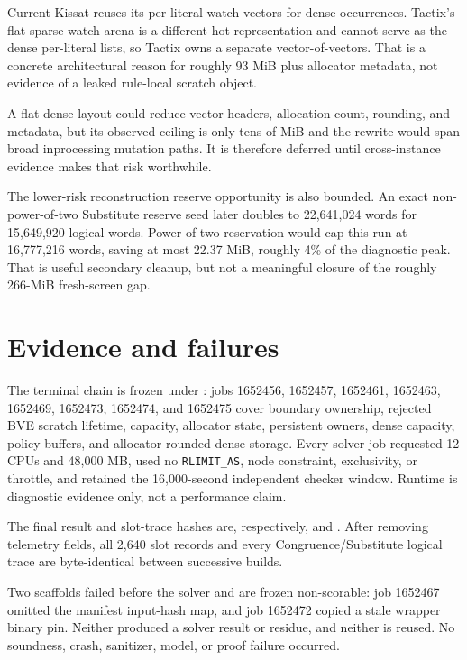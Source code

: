 \documentclass[11pt]{article}
\newcommand{\code}[1]{\texttt{#1}}
\begin{document}
Current Kissat reuses its per-literal watch vectors for dense occurrences.
Tactix's flat sparse-watch arena is a different hot representation and cannot
serve as the dense per-literal lists, so Tactix owns a separate vector-of-vectors.
That is a concrete architectural reason for roughly 93 MiB plus allocator
metadata, not evidence of a leaked rule-local scratch object.

A flat dense layout could reduce vector headers, allocation count, rounding,
and metadata, but its observed ceiling is only tens of MiB and the rewrite
would span broad inprocessing mutation paths.  It is therefore deferred until
cross-instance evidence makes that risk worthwhile.

The lower-risk reconstruction reserve opportunity is also bounded.  An exact
non-power-of-two Substitute reserve seed later doubles to 22,641,024 words for
15,649,920 logical words.  Power-of-two reservation would cap this run at
16,777,216 words, saving at most 22.37 MiB, roughly 4\% of the diagnostic peak.
That is useful secondary cleanup, but not a meaningful closure of the roughly
266-MiB fresh-screen gap.

\section{Evidence and failures}

The terminal chain is frozen under : jobs 1652456,
1652457, 1652461, 1652463, 1652469, 1652473, 1652474, and 1652475 cover
boundary ownership, rejected BVE scratch lifetime, capacity, allocator state,
persistent owners, dense capacity, policy buffers, and allocator-rounded dense
storage.  Every solver job requested 12 CPUs and 48,000 MB, used no
\code{RLIMIT\_AS}, node constraint, exclusivity, or throttle, and retained the
16,000-second independent checker window.  Runtime is diagnostic evidence
only, not a performance claim.

The final result and slot-trace hashes are, respectively,
 and
.  After removing telemetry fields, all 2,640
slot records and every Congruence/Substitute logical trace are byte-identical
between successive builds.

Two scaffolds failed before the solver and are frozen non-scorable: job 1652467
omitted the manifest input-hash map, and job 1652472 copied a stale wrapper
binary pin.  Neither produced a solver result or residue, and neither is reused.
No soundness, crash, sanitizer, model, or proof failure occurred.
\end{document}
